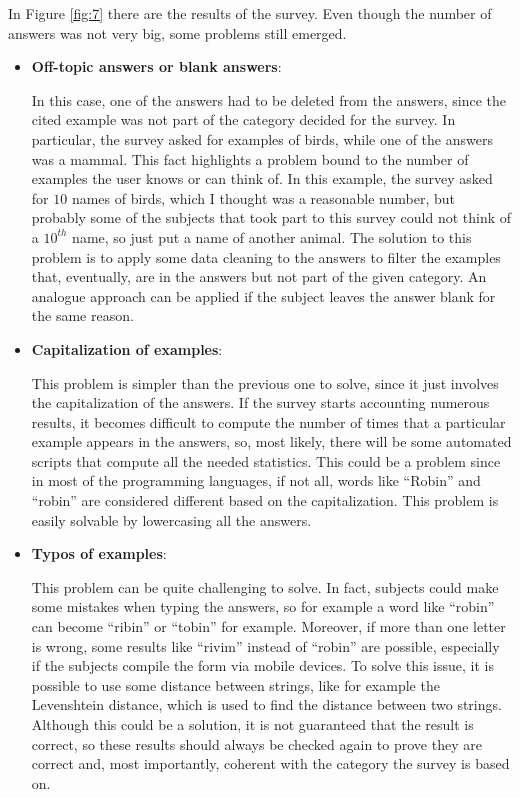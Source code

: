 \documentclass[conference]{IEEEtran}
\begin{document}
		\noindent In Figure \ref{fig:7} there are the results of the survey. Even though the number of answers was not very big, some problems still emerged.
		\begin{itemize}
		
			\item \textbf{Off-topic answers or blank answers}:
				
				In this case, one of the answers had to be deleted from the answers, since the cited example was not part of the category decided for the survey. In particular, the survey asked for examples of birds, 
				while one of the answers was a mammal. This fact highlights a problem bound to the number of examples the user knows or can think of. In this example, the survey asked for $10$ names of birds,
				which I thought was a reasonable number, but probably some of the subjects that took part to this survey could not think of a $10^{th}$ name, so just put a name of another animal. The solution 
				to this problem is to apply some data cleaning to the answers to filter the examples that, eventually, are in the answers but not part of the given category. An analogue approach can be applied if the 
				subject leaves the answer blank for the same reason.
			
			\item \textbf{Capitalization of examples}:
			
				This problem is simpler than the previous one to solve, since it just involves the capitalization of the answers. If the survey starts accounting numerous results, it becomes difficult to 
				compute the number of times that a particular example appears in the answers, so, most likely, there will be some automated scripts that compute all the needed statistics. This could be a problem since 
				in most of the programming languages, if not all, words like ``Robin'' and ``robin'' are considered different based on the capitalization. This problem is easily solvable by lowercasing all the 
				answers.
				
			\item \textbf{Typos of examples}:
				
				This problem can be quite challenging to solve. In fact, subjects could make some mistakes when typing the answers, so for example a word like ``robin'' can become ``ribin'' or ``tobin'' for example. 
				Moreover, if more than one letter is wrong, some results like ``rivim'' instead of ``robin'' are possible, especially if the subjects compile the form via mobile devices. To solve this issue, 
				it is possible to use some distance between strings, like for example the Levenshtein distance, which is used to find the distance between two strings. Although this could be a solution,
				it is not guaranteed that the result is correct, so these results should always be checked again to prove they are correct and, most importantly, coherent with the category the survey is based on.
				

\end{itemize}
\end{document}

